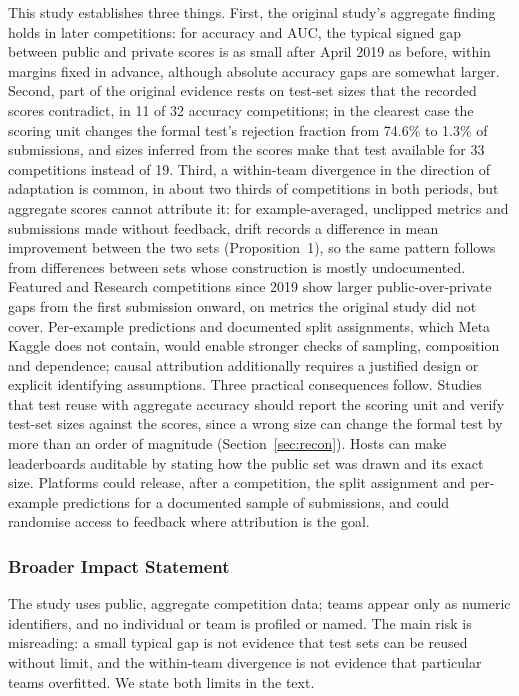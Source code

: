 \documentclass[10pt]{article}
\begin{document}
This study establishes three things. First, the original study's aggregate finding holds in later competitions: for accuracy and AUC, the typical signed gap between public and private scores is as small after April 2019 as before, within margins fixed in advance, although absolute accuracy gaps are somewhat larger. Second, part of the original evidence rests on test-set sizes that the recorded scores contradict, in 11 of 32 accuracy competitions; in the clearest case the scoring unit changes the formal test's rejection fraction from 74.6\% to 1.3\% of submissions, and sizes inferred from the scores make that test available for 33 competitions instead of 19. Third, a within-team divergence in the direction of adaptation is common, in about two thirds of competitions in both periods, but aggregate scores cannot attribute it: for example-averaged, unclipped metrics and submissions made without feedback, drift records a difference in mean improvement between the two sets (Proposition~1), so the same pattern follows from differences between sets whose construction is mostly undocumented. Featured and Research competitions since 2019 show larger public-over-private gaps from the first submission onward, on metrics the original study did not cover. Per-example predictions and documented split assignments, which Meta Kaggle does not contain, would enable stronger checks of sampling, composition and dependence; causal attribution additionally requires a justified design or explicit identifying assumptions. Three practical consequences follow. Studies that test reuse with aggregate accuracy should report the scoring unit and verify test-set sizes against the scores, since a wrong size can change the formal test by more than an order of magnitude (Section~\ref{sec:recon}). Hosts can make leaderboards auditable by stating how the public set was drawn and its exact size. Platforms could release, after a competition, the split assignment and per-example predictions for a documented sample of submissions, and could randomise access to feedback where attribution is the goal.

\subsubsection*{Broader Impact Statement}
The study uses public, aggregate competition data; teams appear only as numeric identifiers, and no individual or team is profiled or named. The main risk is misreading: a small typical gap is not evidence that test sets can be reused without limit, and the within-team divergence is not evidence that particular teams overfitted. We state both limits in the text.
\end{document}
